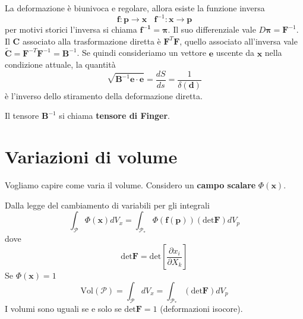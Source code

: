 \documentclass[10pt,a4paper,twoside]{book}
\begin{document}
La deformazione è biunivoca e regolare, allora esiste la funzione inversa
\begin{equation*}
\mathbf{f} :\mathbf{p}\rightarrow \mathbf{x} \ \ \ \ \mathbf{f}^{-1} :\mathbf{x}\rightarrow \mathbf{p}
\end{equation*}
per motivi storici l'inversa si chiama $\mathbf{f^{-1}} =\mathbf{\pi }$. Il suo differenziale vale $D\mathbf{\pi } =\mathbf{F}^{-1}$. Il $\mathbf{C}$ associato alla trasformazione diretta è $\mathbf{F}^{T}\mathbf{F}$, quello associato all'inversa vale $\tilde{\mathbf{C}} =\mathbf{F}^{-T}\mathbf{F}^{-1} =\mathbf{B}^{-1}$. Se quindi consideriamo un vettore $\mathbf{e}$ uscente da $\mathbf{x}$ nella condizione attuale, la quantità
\begin{equation*}
\sqrt{\mathbf{B}^{-1}\mathbf{e} \cdotp \mathbf{e}} =\frac{dS}{ds} =\frac{1}{\delta (\mathbf{d})}
\end{equation*}
è l'inverso dello stiramento della deformazione diretta.

Il tensore $\mathbf{B}^{-1}$ si chiama \textbf{tensore di Finger}.
\section{Variazioni di volume}

Vogliamo capire come varia il volume. Considero un \textbf{campo scalare} $\Phi (\mathbf{x})$.


Dalla legge del cambiamento di variabili per gli integrali
\begin{equation*}
\int _{\mathcal{P}} \Phi (\mathbf{x}) dV_{x} =\int _{\mathcal{P}_{*}} \Phi (\mathbf{f}(\mathbf{p}))(\mathrm{det}\mathbf{F}) dV_{p}
\end{equation*}
dove
\begin{equation*}
\mathrm{det}\mathbf{F} =\mathrm{det}\left[\frac{\partial x_{i}}{\partial X_{k}}\right]
\end{equation*}
Se $\Phi (\mathbf{x}) =1$
\begin{equation*}
\boxed{\mathrm{Vol}(\mathcal{P}) =\int _{\mathcal{P}} dV_{x} =\int _{\mathcal{P}_{*}}(\mathrm{det}\mathbf{F}) dV_{p}}
\end{equation*}
I volumi sono uguali se e solo se $\mathrm{det}\mathbf{F} =1$ (deformazioni isocore).
\end{document}
